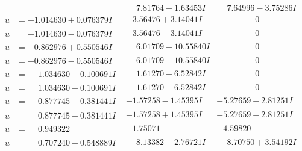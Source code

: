 \documentclass[1p]{elsarticle_modified}
\theoremstyle{definition}
\begin{document}
$$\begin{array}{c|c|c}
 & \phantom{-}7.81764 + 1.63453 I & \phantom{-}7.64996 - 3.75286 I \\ \hline\begin{aligned}
u &= -1.014630 + 0.076379 I\end{aligned}
 & -3.56476 + 3.14041 I & \phantom{-0.000000 } 0 \\ \hline\begin{aligned}
u &= -1.014630 - 0.076379 I\end{aligned}
 & -3.56476 - 3.14041 I & \phantom{-0.000000 } 0 \\ \hline\begin{aligned}
u &= -0.862976 + 0.550546 I\end{aligned}
 & \phantom{-}6.01709 + 10.55840 I & \phantom{-0.000000 } 0 \\ \hline\begin{aligned}
u &= -0.862976 - 0.550546 I\end{aligned}
 & \phantom{-}6.01709 - 10.55840 I & \phantom{-0.000000 } 0 \\ \hline\begin{aligned}
u &= \phantom{-}1.034630 + 0.100691 I\end{aligned}
 & \phantom{-}1.61270 - 6.52842 I & \phantom{-0.000000 } 0 \\ \hline\begin{aligned}
u &= \phantom{-}1.034630 - 0.100691 I\end{aligned}
 & \phantom{-}1.61270 + 6.52842 I & \phantom{-0.000000 } 0 \\ \hline\begin{aligned}
u &= \phantom{-}0.877745 + 0.381441 I\end{aligned}
 & -1.57258 - 1.45395 I & -5.27659 + 2.81251 I \\ \hline\begin{aligned}
u &= \phantom{-}0.877745 - 0.381441 I\end{aligned}
 & -1.57258 + 1.45395 I & -5.27659 - 2.81251 I \\ \hline\begin{aligned}
u &= \phantom{-}0.949322\phantom{ +0.000000I}\end{aligned}
 & -1.75071\phantom{ +0.000000I} & -4.59820\phantom{ +0.000000I} \\ \hline\begin{aligned}
u &= \phantom{-}0.707240 + 0.548889 I\end{aligned}
 & \phantom{-}8.13382 - 2.76721 I & \phantom{-}8.70750 + 3.54192 I \\ \hline\begin{aligned}

\end{aligned}
\end{array}$$
\end{document}
